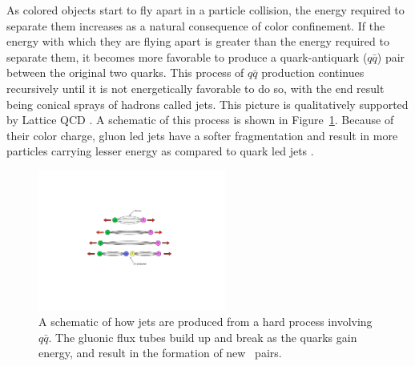
As colored objects start to fly apart in a particle collision, the energy required to separate them increases as a natural consequence of color confinement.
If the energy with which they are flying apart is greater than the energy required to separate them, it becomes more favorable to produce a quark-antiquark ($q\bar{q}$) pair between the original two quarks.
This process of $q \bar{q}$ production continues recursively until it is not energetically favorable to do so, with the end result being conical sprays of hadrons called jets.
This picture is qualitatively supported by Lattice QCD \cite{PhysRevD.71.114513}. 
A schematic of this process is shown in Figure~\ref{fig:qqbar_to_jet}.
Because of their color charge, gluon led jets have a softer fragmentation and result in more particles carrying lesser energy as compared to quark led jets \cite{Abbiendi:1999pi}.

\begin{figure}[htbp]
\begin{center}
\includegraphics[width=0.55\textwidth]{figures/theory/qqbar_to_jet}
\caption{A schematic of how jets are produced from a hard process involving $q \bar{q}$. The gluonic flux tubes build up and break as the quarks gain energy, and result in the formation of new \qqbar\ pairs.}
\label{fig:qqbar_to_jet}
\end{center}
\end{figure}




